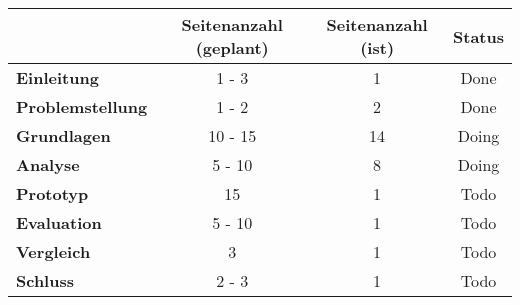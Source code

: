 \begin{table}[H]
\centering
\begin{tabular}{l|c|c|c}
                               & \textbf{Seitenanzahl (geplant)} & \textbf{Seitenanzahl (ist)} & \textbf{Status}        \\ \hline
\textbf{Einleitung}            & 1 - 3                           & {\color{yellow} 1}          & {\color{green} Done}   \\ \hline
\textbf{Problemstellung}       & 1 - 2                           & {\color{green} 2}           & {\color{green} Done}   \\ \hline
\textbf{Grundlagen}            & 10 - 15                         & {\color{green} 14}          & {\color{yellow} Doing} \\ \hline
\textbf{Analyse}               & 5 - 10                          & {\color{green} 8}           & {\color{yellow} Doing} \\ \hline
\textbf{Prototyp}              & 15                              & {\color{red} 1}             & {\color{red} Todo}     \\ \hline
\textbf{Evaluation}            & 5 - 10                          & {\color{red} 1}             & {\color{red} Todo}     \\ \hline
\textbf{Vergleich}             & 3                               & {\color{red} 1}             & {\color{red} Todo}     \\ \hline
\textbf{Schluss}               & 2 - 3                           & {\color{red} 1}             & {\color{red} Todo}     \\
\end{tabular}
\end{table}